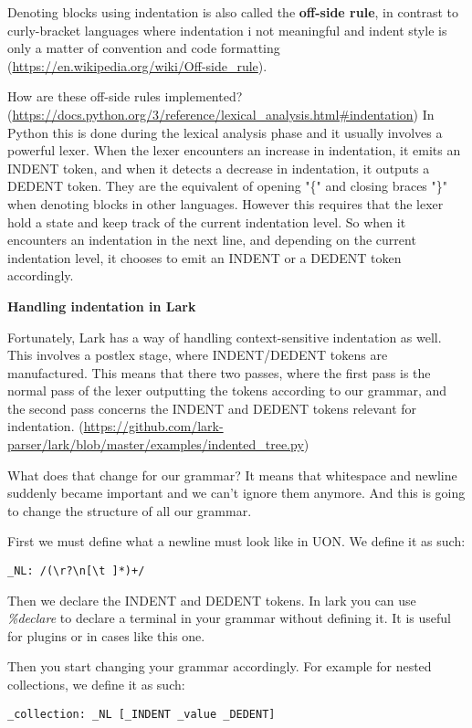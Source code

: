 \documentclass[12pt]{article}
\begin{document}
Denoting blocks using indentation is also called the \textbf{off-side rule}, in contrast to curly-bracket languages where indentation i not meaningful and indent style is only a matter of convention and code formatting (\url{https://en.wikipedia.org/wiki/Off-side_rule}).

How are these off-side rules implemented? (\url{https://docs.python.org/3/reference/lexical_analysis.html#indentation}) In Python this is done during the lexical analysis phase and it usually involves a powerful lexer. When the lexer encounters an increase in indentation, it emits an INDENT token, and when it detects a decrease in indentation, it outputs a DEDENT token. They are the equivalent of opening "\{" and closing braces "\}" when denoting blocks in other languages. However this requires that the lexer hold a state and keep track of the current indentation level. So when it encounters an indentation in the next line, and depending on the current indentation level, it chooses to emit an INDENT or a DEDENT token accordingly. 

\textbf{Handling indentation in Lark}

Fortunately, Lark has a way of handling context-sensitive indentation as well. This involves a postlex stage, where INDENT/DEDENT tokens are manufactured. This means that there two passes, where the first pass is the normal pass of the lexer outputting the tokens according to our grammar, and the second pass concerns the INDENT and DEDENT tokens relevant for indentation. (\url{https://github.com/lark-parser/lark/blob/master/examples/indented_tree.py})

What does that change for our grammar? It means that whitespace and newline suddenly became important and we can't ignore them anymore. And this is going to change the structure of all our grammar.

First we must define what a newline must look like in UON. We define it as such:
\begin{lstlisting}
_NL: /(\r?\n[\t ]*)+/
\end{lstlisting}

Then we declare the INDENT and DEDENT tokens. In lark you can use \emph{\%declare} to declare a terminal in your grammar without defining it. It is useful for plugins or in cases like this one.  

Then you start changing your grammar accordingly. For example for nested collections, we define it as such:

\begin{lstlisting}
_collection: _NL [_INDENT _value _DEDENT]
\end{lstlisting}
\end{document}
